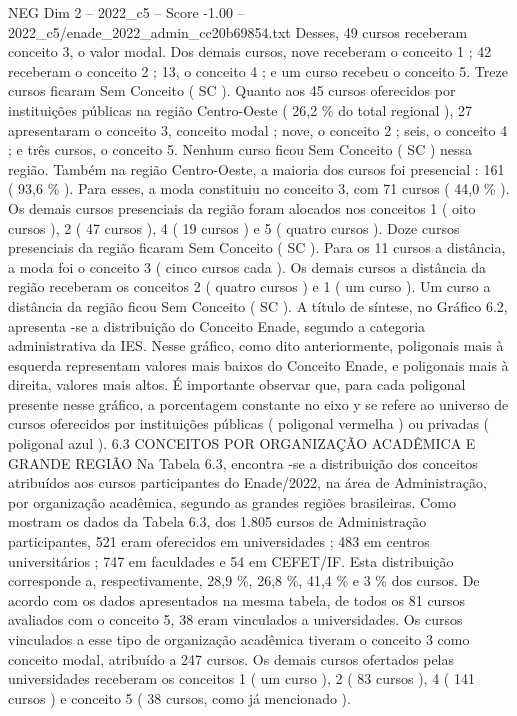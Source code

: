 \begin{textsample}{NEG Dim 2 – 2022\_c5 – Score -1.00 – 2022\_c5/enade\_2022\_admin\_cc20b69854.txt}
Desses, 49 cursos receberam conceito 3, o valor modal.
Dos demais cursos, nove receberam o conceito 1 ; 42 receberam o conceito 2 ; 13, o conceito 4 ; e um curso recebeu o conceito 5.
Treze cursos ficaram Sem Conceito ( SC ).
Quanto aos 45 cursos oferecidos por instituições públicas na região Centro-Oeste ( 26,2 \% do total regional ), 27 apresentaram o conceito 3, conceito modal ; nove, o conceito 2 ; seis, o conceito 4 ; e três cursos, o conceito 5.
Nenhum curso ficou Sem Conceito ( SC ) nessa região.
Também na região Centro-Oeste, a maioria dos cursos foi presencial : 161 ( 93,6 \% ).
Para esses, a moda constituiu no conceito 3, com 71 cursos ( 44,0 \% ).
Os demais cursos presenciais da região foram alocados nos conceitos 1 ( oito cursos ), 2 ( 47 cursos ), 4 ( 19 cursos ) e 5 ( quatro cursos ).
Doze cursos presenciais da região ficaram Sem Conceito ( SC ).
Para os 11 cursos a distância, a moda foi o conceito 3 ( cinco cursos cada ).
Os demais cursos a distância da região receberam os conceitos 2 ( quatro cursos ) e 1 ( um curso ).
Um curso a distância da região ficou Sem Conceito ( SC ).
A título de síntese, no Gráfico 6.2, apresenta -se a distribuição do Conceito Enade, segundo a categoria administrativa da IES.
Nesse gráfico, como dito anteriormente, poligonais mais à esquerda representam valores mais baixos do Conceito Enade, e poligonais mais à direita, valores mais altos.
É importante observar que, para cada poligonal presente nesse gráfico, a porcentagem constante no eixo y se refere ao universo de cursos oferecidos por instituições públicas ( poligonal vermelha ) ou privadas ( poligonal azul ). 6.3 CONCEITOS POR ORGANIZAÇÃO ACADÊMICA E GRANDE REGIÃO Na Tabela 6.3, encontra -se a distribuição dos conceitos atribuídos aos cursos participantes do Enade/2022, na área de Administração, por organização acadêmica, segundo as grandes regiões brasileiras.
Como mostram os dados da Tabela 6.3, dos 1.805 cursos de Administração participantes, 521 eram oferecidos em universidades ; 483 em centros universitários ; 747 em faculdades e 54 em CEFET/IF.
Esta distribuição corresponde a, respectivamente, 28,9 \%, 26,8 \%, 41,4 \% e 3 \% dos cursos.
De acordo com os dados apresentados na mesma tabela, de todos os 81 cursos avaliados com o conceito 5, 38 eram vinculados a universidades.
Os cursos vinculados a esse tipo de organização acadêmica tiveram o conceito 3 como conceito modal, atribuído a 247 cursos.
Os demais cursos ofertados pelas universidades receberam os conceitos 1 ( um curso ), 2 ( 83 cursos ), 4 ( 141 cursos ) e conceito 5 ( 38 cursos, como já mencionado ).

\end{textsample}
